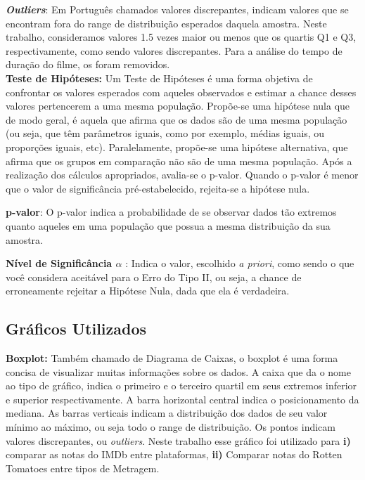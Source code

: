 \documentclass[a4paper, 12pt]{article} %
\begin{document}
\textbf{\emph{Outliers}}: Em Português chamados valores discrepantes, indicam valores que se encontram fora do range de distribuição esperados daquela amostra. Neste trabalho, consideramos valores 1.5 vezes maior ou menos que os quartis Q1 e Q3, respectivamente, como sendo valores discrepantes. Para a análise do tempo de duração do filme, os  foram removidos.\\

\textbf{Teste de Hipóteses:} Um Teste de Hipóteses é uma forma objetiva de confrontar os valores esperados com aqueles observados e estimar a chance desses valores pertencerem a uma mesma população. Propõe-se uma hipótese nula que de modo geral, é aquela que afirma  que os dados são de uma mesma população (ou seja, que têm parâmetros iguais, como por exemplo, médias iguais, ou proporções iguais, etc). Paralelamente, propõe-se uma hipótese alternativa, que afirma que os grupos em comparação não são de uma mesma população. Após a realização dos cálculos apropriados, avalia-se o p-valor. Quando o p-valor é menor que o valor de significância pré-estabelecido, rejeita-se a hipótese nula.

\textbf{p-valor}: O p-valor indica a probabilidade de se observar dados tão extremos quanto aqueles em uma população que possua a mesma distribuição da sua amostra. 

\textbf{Nível de Significância $\alpha$} : Indica o valor, escolhido \emph{a priori}, como sendo o que você considera aceitável para o Erro do Tipo II, ou seja, a chance de erroneamente rejeitar a Hipótese Nula, dada que ela é verdadeira. 

\subsection{Gráficos Utilizados}

\textbf{Boxplot:} Também chamado de Diagrama de Caixas, o boxplot é uma forma concisa de visualizar muitas informações sobre os dados. A caixa que da o nome ao tipo de gráfico, indica o primeiro e o terceiro quartil em seus extremos inferior e superior respectivamente. A barra horizontal central indica o posicionamento da mediana.  As barras verticais indicam a distribuição dos dados de seu valor mínimo ao máximo, ou seja todo o range de distribuição. Os pontos indicam valores discrepantes, ou \emph{outliers}. Neste trabalho esse gráfico foi utilizado para \textbf{i)} comparar as notas do IMDb entre plataformas, \textbf{ii)} Comparar notas do Rotten Tomatoes entre tipos de Metragem.\\
\end{document}
